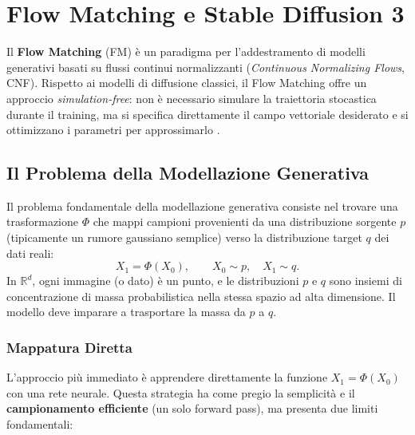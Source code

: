 \chapter{Flow Matching e Stable Diffusion 3}
\label{ch:flow-matching}

Il \textbf{Flow Matching} (FM) è un paradigma per l'addestramento di
modelli generativi basati su flussi continui normalizzanti (\emph{Continuous
Normalizing Flows}, CNF). Rispetto ai modelli di diffusione classici,
il Flow Matching offre un approccio \emph{simulation-free}: non è
necessario simulare la traiettoria stocastica durante il training, ma
si specifica direttamente il campo vettoriale desiderato e si ottimizzano
i parametri per approssimarlo \citep{lipman2022flow,bishop2024}.

\section{Il Problema della Modellazione Generativa}
\label{sec:fm-generative-problem}

Il problema fondamentale della modellazione generativa consiste nel trovare
una trasformazione $\Phi$ che mappi campioni provenienti da una distribuzione
sorgente $p$ (tipicamente un rumore gaussiano semplice) verso la distribuzione
target $q$ dei dati reali:
\begin{equation}
  X_1 = \Phi(X_0), \qquad X_0 \sim p,\quad X_1 \sim q.
  \label{eq:fm-gen-problem}
\end{equation}
In $\mathbb{R}^d$, ogni immagine (o dato) è un punto, e le distribuzioni
$p$ e $q$ sono insiemi di concentrazione di massa probabilistica nella
stessa spazio ad alta dimensione. Il modello deve imparare a trasportare
la massa da $p$ a $q$.

\subsection{Mappatura Diretta}
\label{subsec:fm-direct-mapping}

L'approccio più immediato è apprendere direttamente la funzione
$X_1 = \Phi(X_0)$ con una rete neurale. Questa strategia ha come
pregio la semplicità e il \textbf{campionamento efficiente} (un solo
forward pass), ma presenta due limiti fondamentali:


